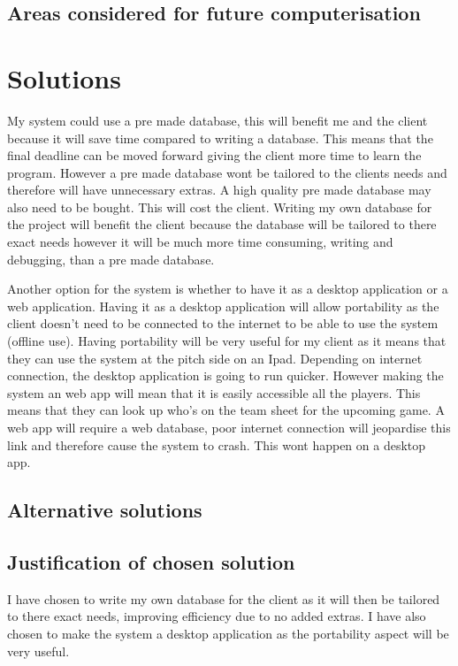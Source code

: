 \subsection{Areas considered for future computerisation}

\section{Solutions}
My system could use a pre made database, this will benefit me and the client because it will save time compared to writing a database. This means that the final deadline can be moved forward giving the client more time to learn the program.  However a pre made database wont be tailored to the clients needs and therefore will have unnecessary extras. A high quality pre made database may also need to be bought. This will cost the client. Writing my own database for the project will benefit the client because the database will be tailored to there exact needs however it will be much more time consuming, writing and debugging, than a pre made database.

Another option for the system is whether to have it as a desktop application or a web application. Having it as a desktop application will allow portability as the client doesn't need to be connected to the internet to be able to use the system (offline use). Having portability will be very useful for my client as it means that they can use the system at the pitch side on an Ipad. Depending on internet connection, the desktop application is going to run quicker. However making the system an web app will mean that it is easily accessible all the players. This means that they can look up who's on the team sheet for the upcoming game. A web app will require a web database, poor internet connection will jeopardise this link and therefore cause the system to crash. This wont happen on a desktop app. 
\subsection{Alternative solutions}

\subsection{Justification of chosen solution}
I have chosen to write my own database for the client as it will then be tailored to there exact needs, improving efficiency due to no added extras. I have also chosen to make the system a desktop application as the portability aspect will be very useful.